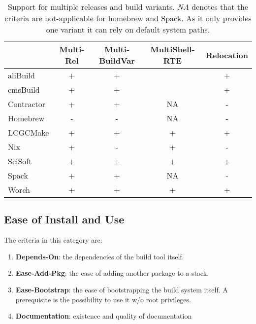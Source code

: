 \documentclass[12pt,a4paper]{article}
\begin{document}
\begin{table}
\centering
\begin{tabular}{lcccc}
&Multi-Rel & Multi-BuildVar & MultiShell-RTE & Relocation \\ \hline
aliBuild & \cellcolor{green} +  & \cellcolor{green} + & \cellcolor{green} & \cellcolor{green} + \\
cmsBuild & \cellcolor{green} +  & \cellcolor{green} + & \cellcolor{green} & \cellcolor{green} + \\
Contractor & \cellcolor{green} + & \cellcolor{green} + & \cellcolor{yellow} NA  &  \cellcolor{red} - \\
Homebrew &  \cellcolor{red} - & \cellcolor{red} -   & \cellcolor{yellow} NA   & \cellcolor{red} -  \\
LCGCMake & \cellcolor{green} + & \cellcolor{green} + & \cellcolor{green} + & \cellcolor{green} +\\
Nix & \cellcolor{green} + & \cellcolor{red} - & \cellcolor{green} +  & \cellcolor{red} -\\
SciSoft &  \cellcolor{green} + & \cellcolor{green} + &  \cellcolor{green} + & \cellcolor{green} + \\
Spack & \cellcolor{green} + & \cellcolor{green} + & \cellcolor{yellow} NA & \cellcolor{red} -\\
Worch &  \cellcolor{green} + &  \cellcolor{green}  + &  \cellcolor{green} + &  \cellcolor{green} +
\end{tabular}
\caption{\label{tab:taxonomyVariants}Support for multiple releases and build variants. \emph{NA} denotes that the criteria are not-applicable for homebrew and Spack. As it only provides one variant it can rely on default system paths.}
\end{table}

\subsection{Ease of Install and Use}
The criteria in this category are:
\begin{enumerate}
\item \textbf{Depends-On}: the dependencies of the build tool itself.
\item \textbf{Ease-Add-Pkg}: the ease of adding another package to a stack.
\item \textbf{Ease-Bootstrap}: the ease of bootstrapping the build system itself. A prerequisite is the possibility to use it w/o root privileges. 
\item \textbf{Documentation}: existence and quality of documentation
\end{enumerate}
\end{document}
